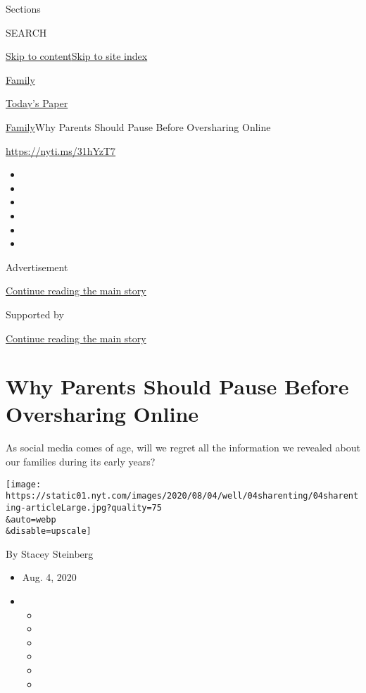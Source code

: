 Sections

SEARCH

\protect\hyperlink{site-content}{Skip to
content}\protect\hyperlink{site-index}{Skip to site index}

\href{https://www.nytimes.com/section/well/family}{Family}

\href{https://myaccount.nytimes.com/auth/login?response_type=cookie\&client_id=vi}{}

\href{https://www.nytimes.com/section/todayspaper}{Today's Paper}

\href{/section/well/family}{Family}\textbar{}Why Parents Should Pause
Before Oversharing Online

\url{https://nyti.ms/31hYzT7}

\begin{itemize}
\item
\item
\item
\item
\item
\item
\end{itemize}

Advertisement

\protect\hyperlink{after-top}{Continue reading the main story}

Supported by

\protect\hyperlink{after-sponsor}{Continue reading the main story}

\hypertarget{why-parents-should-pause-before-oversharing-online}{%
\section{Why Parents Should Pause Before Oversharing
Online}\label{why-parents-should-pause-before-oversharing-online}}

As social media comes of age, will we regret all the information we
revealed about our families during its early years?

\texttt{[image: https://static01.nyt.com/images/2020/08/04/well/04sharenting/04sharenting-articleLarge.jpg?quality=75\\\&auto=webp\\\&disable=upscale]}

By Stacey Steinberg

\begin{itemize}
\item
  Aug. 4, 2020
\item
  \begin{itemize}
  \item
  \item
  \item
  \item
  \item
  \item
  \end{itemize}
\end{itemize}

